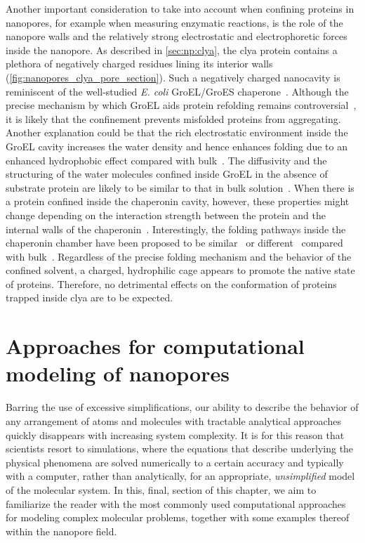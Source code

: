 Another important consideration to take into account when confining proteins in nanopores, for example when
measuring enzymatic reactions, is the role of the nanopore walls and the relatively strong electrostatic and
electrophoretic forces inside the nanopore. As described in \cref{sec:np:clya}, the \gls{clya} protein
contains a plethora of negatively charged residues lining its interior walls
(\cref{fig:nanopores_clya_pore_section}). Such a negatively charged nanocavity is reminiscent of the
well-studied \textit{E. coli} {GroEL/GroES} chaperone~\cite{Xu-1997}. Although the precise mechanism by which
{GroEL} aids protein refolding remains
controversial~\cite{England-2008,England-2008b,Motojima-2012,Weber-2013}, it is likely that the confinement
prevents misfolded proteins from aggregating. Another explanation could be that the rich electrostatic
environment inside the {GroEL} cavity increases the water density and hence enhances folding due to an
enhanced hydrophobic effect compared with bulk~\cite{England-2008,England-2008b}. The diffusivity and the
structuring of the water molecules confined inside {GroEL} in the absence of substrate protein are likely to
be similar to that in bulk solution~\cite{Franck-2014}. When there is a protein confined inside the chaperonin
cavity, however, these properties might change depending on the interaction strength between the protein and
the internal walls of the chaperonin~\cite{Weber-2013}. Interestingly, the folding pathways inside the
chaperonin chamber have been proposed to be similar~\cite{Horst-2007} or different~\cite{Jewett-2004} compared
with bulk~\cite{Apetri-2008}. Regardless of the precise folding mechanism and the behavior of the confined
solvent, a charged, hydrophilic cage appears to promote the native state of proteins. Therefore, no
detrimental effects on the conformation of proteins trapped inside \gls{clya} are to be expected.


%
%
%
%


\section{Approaches for computational modeling of nanopores}
%
\label{sec:np:modeling}
%

Barring the use of excessive simplifications, our ability to describe the behavior of any arrangement of atoms
and molecules with tractable analytical approaches quickly disappears with increasing system complexity. It is
for this reason that scientists resort to simulations, where the equations that describe underlying the
physical phenomena are solved numerically to a certain accuracy and typically with a computer, rather than
analytically, for an appropriate, \emph{unsimplified} model of the molecular system. In this, final, section
of this chapter, we aim to familiarize the reader with the most commonly used computational approaches for
modeling complex molecular problems, together with some examples thereof within the nanopore field.

